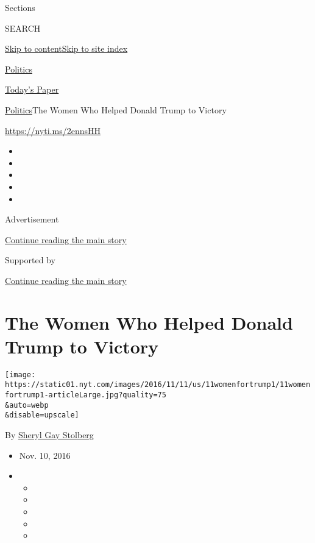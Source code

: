 Sections

SEARCH

\protect\hyperlink{site-content}{Skip to
content}\protect\hyperlink{site-index}{Skip to site index}

\href{https://www.nytimes.com/section/politics}{Politics}

\href{https://myaccount.nytimes.com/auth/login?response_type=cookie\&client_id=vi}{}

\href{https://www.nytimes.com/section/todayspaper}{Today's Paper}

\href{/section/politics}{Politics}\textbar{}The Women Who Helped Donald
Trump to Victory

\url{https://nyti.ms/2ennsHH}

\begin{itemize}
\item
\item
\item
\item
\item
\end{itemize}

Advertisement

\protect\hyperlink{after-top}{Continue reading the main story}

Supported by

\protect\hyperlink{after-sponsor}{Continue reading the main story}

\hypertarget{the-women-who-helped-donald-trump-to-victory}{%
\section{The Women Who Helped Donald Trump to
Victory}\label{the-women-who-helped-donald-trump-to-victory}}

\texttt{[image: https://static01.nyt.com/images/2016/11/11/us/11womenfortrump1/11womenfortrump1-articleLarge.jpg?quality=75\\\&auto=webp\\\&disable=upscale]}

By \href{http://www.nytimes.com/by/sheryl-gay-stolberg}{Sheryl Gay
Stolberg}

\begin{itemize}
\item
  Nov. 10, 2016
\item
  \begin{itemize}
  \item
  \item
  \item
  \item
  \item
  \end{itemize}
\end{itemize}

